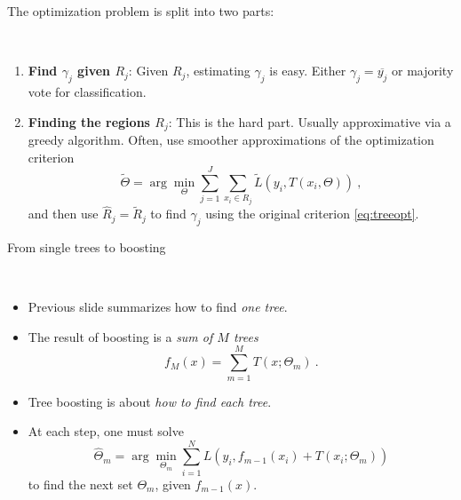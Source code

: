 \documentclass[
  10pt,
  ignorenonframetext,
]{beamer}
\providecommand{\tightlist}{%
  \setlength{\itemsep}{0pt}\setlength{\parskip}{0pt}}
\begin{document}
\begin{frame}
\label{sl:regions}

The optimization problem is split into two parts:

\(~\)

\begin{enumerate}
[1)]
\tightlist
\item
  \textbf{Find \(\gamma_j\) given \(R_j\)}: Given \(R_j\), estimating
  \(\gamma_j\) is easy. Either \(\gamma_j=\overline{y_j}\) or majority
  vote for classification.
\end{enumerate}

\vspace{2mm}

\begin{enumerate}
[1)]
\setcounter{enumi}{1}
\tightlist
\item
  \textbf{Finding the regions \(R_j\)}: This is the hard part. Usually
  approximative via a greedy algorithm. Often, use smoother
  approximations of the optimization criterion
  \begin{equation}\label{eq:approx}
  \tilde\Theta = \arg \min_\Theta \sum_{j=1}^J \sum_{x_i \in R_j} \tilde{L}(y_i,T(x_i,\Theta)) \ , 
  \end{equation} and then use \(\hat{R}_j=\tilde{R}_j\) to find
  \(\gamma_j\) using the original criterion \eqref{eq:treeopt}.
\end{enumerate}
\end{frame}

\begin{frame}
\begin{block}{From single trees to boosting}
\protect\hypertarget{from-single-trees-to-boosting}{}
\label{sl:toBoosting}

\(~\)

\begin{itemize}
\tightlist
\item
  Previous slide summarizes how to find \emph{one tree}.
\end{itemize}

\vspace{2mm}

\begin{itemize}
\item
  The result of boosting is a \emph{sum of \(M\) trees}
  \[f_M(x) = \sum_{m=1}^M T(x;\Theta_m) \ .\] \vspace{2mm}
\item
  Tree boosting is about \emph{how to find each tree}.
\end{itemize}

\vspace{2mm}

\begin{itemize}
\tightlist
\item
  At each step, one must solve \begin{equation}\label{eq:boosted}
  \hat\Theta_m = \arg \min_{\Theta_m} \sum_{i=1}^N L\left(y_i, f_{m-1}(x_i) + T(x_i;\Theta_m)\right) 
  \end{equation} to find the next set \(\Theta_m\), given
  \(f_{m-1}(x)\).
\end{itemize}
\end{block}
\end{frame}
\end{document}
